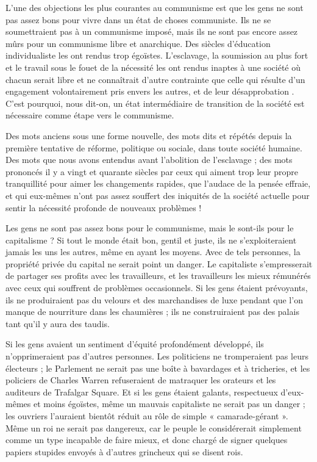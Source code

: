 L'une des objections les plus courantes au communisme est que les gens ne sont pas assez bons pour vivre dans un état de choses communiste. Ils ne se soumettraient pas à un communisme imposé, mais ils ne sont pas encore assez mûrs pour un communisme libre et anarchique. Des siècles d'éducation individualiste les ont rendus trop égoïstes. L'esclavage, la soumission au plus fort et le travail sous le fouet de la nécessité les ont rendus inaptes à une société où chacun serait libre et ne connaîtrait d'autre contrainte que celle qui résulte d'un engagement volontairement pris envers les autres, et de leur désapprobation . C'est pourquoi, nous dit-on, un état intermédiaire de transition de la société est nécessaire comme étape vers le communisme.

Des mots anciens sous une forme nouvelle, des mots dits et répétés depuis la première tentative de réforme, politique ou sociale, dans toute société humaine. Des mots que nous avons entendus avant l'abolition de l'esclavage ; des mots prononcés il y a vingt et quarante siècles par ceux qui aiment trop leur propre tranquillité pour aimer les changements rapides, que l'audace de la pensée effraie, et qui eux-mêmes n'ont pas assez souffert des iniquités de la société actuelle pour sentir la nécessité profonde de nouveaux problèmes !

Les gens ne sont pas assez bons pour le communisme, mais le sont-ils pour le capitalisme ? Si tout le monde était bon, gentil et juste, ils ne s'exploiteraient jamais les uns les autres, même en ayant les moyens. Avec de tels personnes, la propriété privée du capital ne serait point un danger. Le capitaliste s'empresserait de partager ses profits avec les travailleurs, et les travailleurs les mieux rémunérés avec ceux qui souffrent de problèmes occasionnels. Si les gens étaient prévoyants, ils ne produiraient pas du velours et des marchandises de luxe pendant que l'on manque de nourriture dans les chaumières ; ils ne construiraient pas des palais tant qu'il y aura des taudis.

Si les gens avaient un sentiment d'équité profondément développé, ils n'opprimeraient pas d'autres personnes. Les politiciens ne tromperaient pas leurs électeurs ; le Parlement ne serait pas une boîte à bavardages et à tricheries, et les policiers de Charles Warren refuseraient de matraquer les orateurs et les auditeurs de Trafalgar Square. Et si les gens étaient galants, respectueux d'eux-mêmes et moins égoïstes, même un mauvais capitaliste ne serait pas un danger ; les ouvriers l'auraient bientôt réduit au rôle de simple « camarade-gérant ». Même un roi ne serait pas dangereux, car le peuple le considérerait simplement comme un type incapable de faire mieux, et donc chargé de signer quelques papiers stupides envoyés à d'autres grincheux qui se disent rois.

